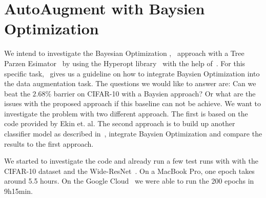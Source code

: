 \documentclass[10pt,twocolumn,letterpaper]{article}
\begin{document}
\section{AutoAugment with Baysien Optimization}
We intend to investigate the Bayesian Optimization \cite{2018arXiv180702811F},~\cite{Goodfellow-et-al-2016} approach with a Tree Parzen Esimator~\cite{Kaggle_AMT} by using the Hyperopt library~\cite{HyperOpt} with the help of~\cite{BO_Hyperopt}. For this specific task,~\cite{2017arXiv171010564T} gives us a guideline on how to integrate Baysien Optimization into the data augmentation task. The questions we would like to answer are: Can we beat the $2.68\%$ barrier on CIFAR-10 with a Baysien approach? Or what are the issues with the proposed approach if this baseline can not be achieve. 
We want to investigate the problem with two different approach. The first is based on the code provided by Ekin et. al. The second approach is to build up another classifier model as described in~\cite{cifar-10-cl}, integrate Baysien Optimization and compare the results to the first approach.

We started to investigate the code and already run a few test runs with with the CIFAR-10 dataset and the Wide-ResNet~\cite{Ekin}. On a MacBook Pro, one epoch takes around 5.5 hours. On the Google Cloud~\cite{GCloud} we were able to run the 200 epochs in 9h15min.




{\small


}
\end{document}
